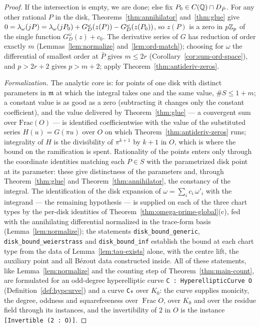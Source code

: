 \begin{proof}
\leanok
If the intersection is empty, we are done; else fix $P_0 \in C(\mathbb{Q}) \cap D_{\bar P}$.
For any other rational $P$ in the disk, Theorems~\ref{thm:annihilator}
and~\ref{thm:glue} give
$0 = \lambda_\omega(j P) = \lambda_\omega(j P_0) + G^{\omega}_D(z(P)) -
G^{\omega}_D(z(P_0))$, so $z(P)$ is a zero in $p\mathbb{Z}_p$ of the single function
$G^{\omega}_D(z) + c_0$. The derivative series of $G$ has reduction of order exactly
$m$ (Lemmas~\ref{lem:normalize} and~\ref{lem:ord-match}); choosing for $\omega$ the
differential of smallest order at $\bar P$ gives $m \le 2r$
(Corollary~\ref{cor:sum-ord-space}), and $p > 2r+2$ gives $p > m + 2$; apply
Theorem~\ref{thm:antideriv-zeros}.

\emph{Formalization.} The analytic core is: for points of one disk with distinct
parameters in $\mathfrak m$ at which the integral takes one and the same value,
$\#S \le 1 + m$; a constant value is as good as a zero (subtracting it changes only the
constant coefficient), and the value delivered by Theorem~\ref{thm:glue} --- a
convergent sum over $\mathrm{Frac}(O)$ --- is identified coefficientwise with the value
of the substituted series $H(u) = G(\pi u)$ over $O$ on which
Theorem~\ref{thm:antideriv-zeros} runs; integrality of $H$ is the divisibility of
$\pi^{k+1}$ by $k+1$ in $O$, which is where the bound on the ramification is spent. Rationality of the points enters only through the coordinate
identities matching each $P \in S$ with the parametrized disk point at its parameter:
these give distinctness of the parameters and, through Theorem~\ref{thm:glue} and
Theorem~\ref{thm:annihilator}, the constancy of the integral. The identification of the
disk expansion of $\omega = \sum_i c_i\,\omega'_i$ with the integrand --- the remaining
hypothesis --- is supplied on each of the three chart types by the per-disk identities
of Theorem~\ref{thm:omega-prime-global}(c), fed with the annihilating differential
normalized in the trace-form basis (Lemma~\ref{lem:normalize}); the statements
\texttt{disk\_bound\_generic}, \texttt{disk\_bound\_weierstrass} and
\texttt{disk\_bound\_inf} establish the bound at each chart type from the data of
Lemma~\ref{lem:tau-exists} alone, with the centre lift, the auxiliary point and all
B\'ezout data constructed inside. All of these statements, like Lemma~\ref{lem:normalize}
and the counting step of Theorem~\ref{thm:main-count}, are formulated for an odd-degree
hyperelliptic curve \texttt{C : HyperellipticCurve O} (Definition~\ref{def:hypcurve}) and a
curve \texttt{C₀} over $K_0$: the curve supplies monicity, the degree, oddness and
squarefreeness over $\operatorname{Frac} O$, over $K_0$ and over the residue field through
its instances, and the invertibility of $2$ in $O$ is the instance \texttt{[Invertible (2 : O)]}.
\end{proof}

